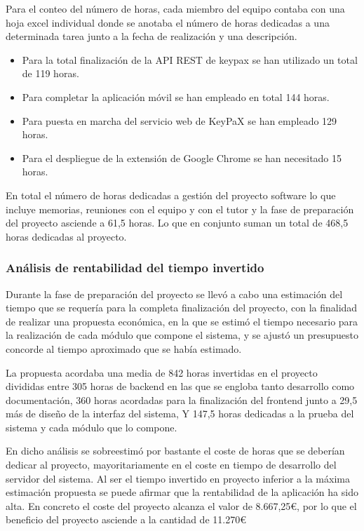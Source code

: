 \documentclass{article}
\begin{document}
Para el conteo del número de horas, cada miembro del equipo contaba con una hoja excel individual donde se anotaba el número de horas dedicadas a una determinada tarea junto a la fecha de realización y una descripción.

\begin{itemize}
  \item Para la total finalización de la API REST de keypax se han utilizado un total de 119 horas.
  \item Para completar la aplicación móvil se han empleado en total 144 horas.
  \item Para puesta en marcha del servicio web de KeyPaX se han empleado 129 horas.
  \item Para el despliegue de la extensión de Google Chrome se han necesitado 15 horas.
\end{itemize}

En total el número de horas dedicadas a gestión del proyecto software lo que incluye memorias, reuniones con el equipo y con el tutor y la fase de preparación del proyecto asciende a 61,5 horas. Lo que en conjunto suman un total de 468,5 horas dedicadas al proyecto.


\subsubsection*{Análisis de rentabilidad del tiempo invertido}

Durante la fase de preparación del proyecto se llevó a cabo una estimación del tiempo que se requería para la completa finalización del proyecto, con la finalidad de realizar una propuesta económica, en la que se estimó el tiempo necesario para la realización de cada módulo que compone el sistema, y se ajustó un presupuesto concorde al tiempo aproximado que se había estimado.

La propuesta acordaba una media de 842 horas invertidas en el proyecto divididas entre 305 horas de backend en las que se engloba tanto desarrollo como documentación, 360 horas acordadas para la finalización del frontend junto a 29,5 más de diseño de la interfaz del sistema, Y 147,5 horas dedicadas a la prueba del sistema y cada módulo que lo compone.

En dicho análisis se sobreestimó por bastante el coste de horas que se deberían dedicar al proyecto, mayoritariamente en el coste en tiempo de desarrollo del servidor del sistema. Al ser el tiempo invertido en proyecto inferior a la máxima estimación propuesta se puede afirmar que la rentabilidad de la aplicación ha sido alta. En concreto el coste del proyecto alcanza el valor de 8.667,25€, por lo que el beneficio del proyecto asciende a la cantidad de 11.270€
\end{document}
